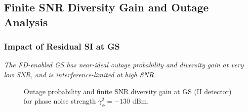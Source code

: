 \subsection{Finite SNR Diversity Gain and Outage Analysis}

\subsubsection{Impact of Residual SI at GS}

\begin{observation}
\emph{\emph{The FD-enabled GS has near-ideal outage probability and diversity gain at very low SNR, and is interference-limited at high SNR.}
}\end{observation}

\begin{figure}[]
\centering
{}
\hfil
{}
\caption{Outage probability and finite SNR diversity gain at GS (II detector) for phase noise strength $\gamma_{\phi}^2=-130$ dBm.}
\label{fig:interference_management_HBD_ACS_gs_outage_diversity_gain}
\end{figure}

